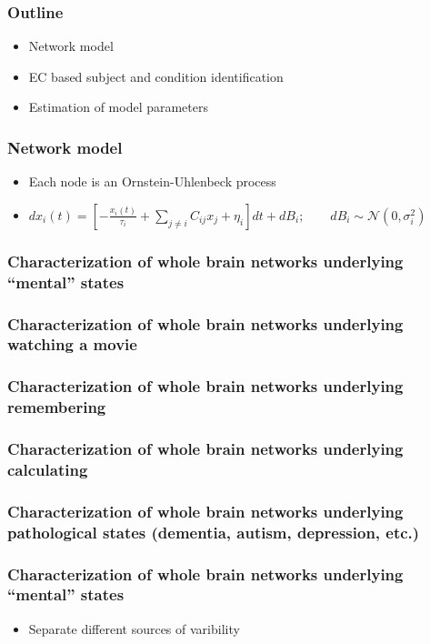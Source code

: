 \documentclass[final]{beamer}
\begin{document}
\begin{frame}
\transdissolve
\frametitle{Outline}
\begin{itemize}
		\pause
	\item Network model
		\pause
	\item EC based subject and condition identification
		\pause
	\item Estimation of model parameters
\end{itemize}
\end{frame}

\begin{frame}
\transdissolve
\frametitle{Network model}
\begin{itemize}
		\pause
	\item Each node is an Ornstein-Uhlenbeck process 
		\pause
	\item $dx_i(t) = [-\frac{x_i(t)}{\tau_i} + \sum_{j\ne i} C_{ij} x_j + \eta_i]dt + dB_i;\qquad dB_i\sim\mathcal{N}(0,\sigma_i^2)$ 
		\pause
\end{itemize}
\end{frame}

\begin{frame}
\frametitle<1>{Characterization of whole brain networks underlying ``mental'' states}
\frametitle<2>{Characterization of whole brain networks underlying watching a movie}
\frametitle<3>{Characterization of whole brain networks underlying remembering}
\frametitle<4>{Characterization of whole brain networks underlying calculating}
\frametitle<5>{Characterization of whole brain networks underlying pathological states (dementia, autism, depression, etc.)}
\frametitle<6->{Characterization of whole brain networks underlying ``mental'' states}
\transdissolve
\begin{itemize}
	\item<7-> Separate different sources of varibility
\end{itemize}
\begin{center}
\end{center}
\end{frame}
\end{document}
